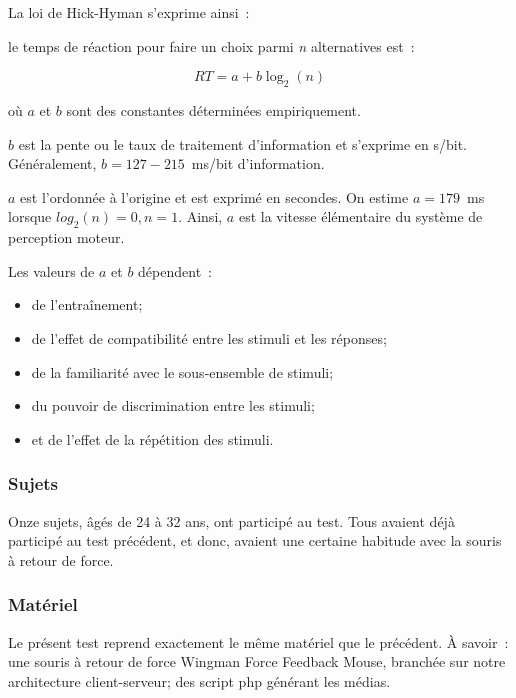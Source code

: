 \documentclass[
]{book}
\providecommand{\tightlist}{%
  \setlength{\itemsep}{0pt}\setlength{\parskip}{0pt}}
\begin{document}
La loi de Hick-Hyman s'exprime ainsi~:

le temps de réaction pour faire un choix parmi \emph{n} alternatives est~:

\begin{equation}
RT=a+b\log_2(n)\label{eq:hick}\end{equation}

où \(a\) et \(b\) sont des
constantes déterminées empiriquement.

\(b\) est la pente ou le taux de traitement
d'information et s'exprime en s/bit. Généralement, \(b=127−215\)~ms/bit
d'information.

\(a\) est l'ordonnée à l'origine et est exprimé en secondes. On estime
\(a=179\)~ms lorsque \(log_2(n)=0, n=1\). Ainsi, \(a\) est la vitesse
élémentaire du système de perception moteur.

Les valeurs de \(a\) et \(b\) dépendent~:

\begin{itemize}
\tightlist
\item
  de l'entraînement;
\item
  de l'effet de compatibilité entre les stimuli et les
  réponses;
\item
  de la familiarité avec le sous-ensemble de
  stimuli;
\item
  du pouvoir de discrimination entre les stimuli;
\item
  et de l'effet de la répétition des stimuli.
\end{itemize}

\hypertarget{sujets-2}{%
\subsubsection{Sujets}\label{sujets-2}}

Onze sujets, âgés de 24 à 32 ans, ont participé au test. Tous avaient déjà
participé au test précédent, et donc, avaient une certaine habitude avec la
souris à retour de force.

\hypertarget{matuxe9riel-2}{%
\subsubsection{Matériel}\label{matuxe9riel-2}}

Le présent test reprend exactement le même matériel que le précédent. À
savoir~: une souris à retour de force Wingman Force Feedback Mouse, branchée
sur notre architecture client-serveur; des script php générant les
médias.
\end{document}
